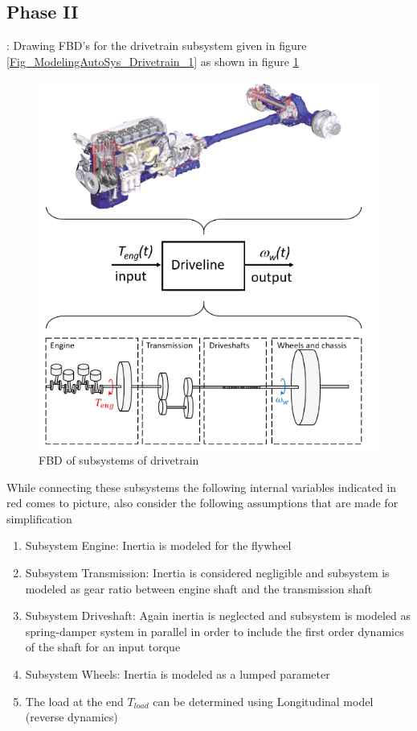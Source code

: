 \subsection{Phase II}: Drawing FBD's for the drivetrain subsystem given in figure \ref{Fig_ModelingAutoSys_Drivetrain_1} as shown in figure \ref{Fig_ModelingAutoSys_Drivetrain_2}
\begin{figure}[h!]
	\centering
	\includegraphics[width=\linewidth]{Bilder/ModelingAutoSys_Drivetrain_1}
	\caption{FBD of subsystems of drivetrain}
	\label{Fig_ModelingAutoSys_Drivetrain_2}
\end{figure}
While connecting these subsystems the following internal variables indicated in red comes to picture, also consider the following assumptions that are made for simplification
\begin{enumerate}
	\item Subsystem Engine: Inertia is modeled for the flywheel
	\item Subsystem Transmission: Inertia is considered negligible and subsystem is modeled as gear ratio between engine shaft and the transmission shaft
	\item Subsystem Driveshaft: Again inertia is neglected and subsystem is modeled as spring-damper system in parallel in order to include the first order dynamics of the shaft for an input torque
	\item Subsystem Wheels: Inertia is modeled as a lumped parameter
	\item The load at the end $T_{load}$ can be determined using Longitudinal model (reverse dynamics)
\end{enumerate}

